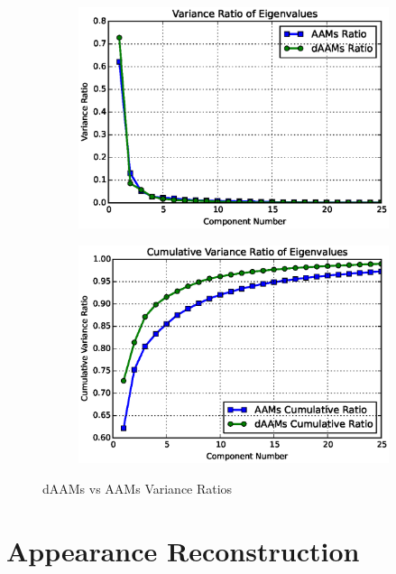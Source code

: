\begin{figure}[!t]
    \centering
    \begin{subfigure}[b]{0.4\textwidth}
            \includegraphics[width=\textwidth]{supports/Model_Analysis/var_ratio}
    \end{subfigure}
    \begin{subfigure}[b]{0.4\textwidth}
            \includegraphics[width=\textwidth]{supports/Model_Analysis/cumu_var_ratio}
    \end{subfigure}
    \caption{dAAMs vs AAMs Variance Ratios}
    \label{fig:compact}
\end{figure}

\section{Appearance Reconstruction}
\label{sec:reconstruct}

